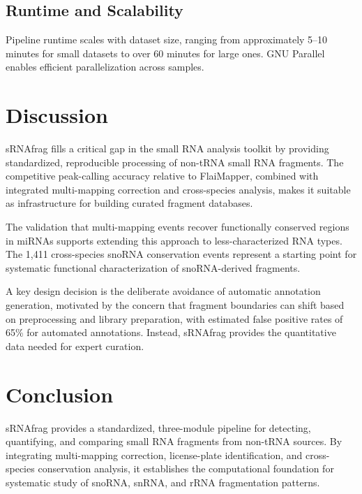 \documentclass[11pt]{article}
\begin{document}
\subsection{Runtime and Scalability}

Pipeline runtime scales with dataset size, ranging from approximately 5--10 minutes for small datasets to over 60 minutes for large ones. GNU Parallel enables efficient parallelization across samples.

\section{Discussion}

sRNAfrag fills a critical gap in the small RNA analysis toolkit by providing standardized, reproducible processing of non-tRNA small RNA fragments. The competitive peak-calling accuracy relative to FlaiMapper, combined with integrated multi-mapping correction and cross-species analysis, makes it suitable as infrastructure for building curated fragment databases.

The validation that multi-mapping events recover functionally conserved regions in miRNAs supports extending this approach to less-characterized RNA types. The 1,411 cross-species snoRNA conservation events represent a starting point for systematic functional characterization of snoRNA-derived fragments.

A key design decision is the deliberate avoidance of automatic annotation generation, motivated by the concern that fragment boundaries can shift based on preprocessing and library preparation, with estimated false positive rates of 65\% for automated annotations. Instead, sRNAfrag provides the quantitative data needed for expert curation.

\section{Conclusion}

sRNAfrag provides a standardized, three-module pipeline for detecting, quantifying, and comparing small RNA fragments from non-tRNA sources. By integrating multi-mapping correction, license-plate identification, and cross-species conservation analysis, it establishes the computational foundation for systematic study of snoRNA, snRNA, and rRNA fragmentation patterns.



\end{document}
